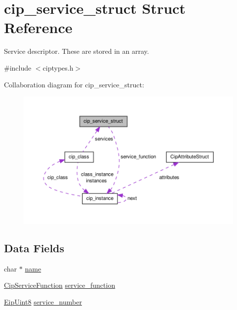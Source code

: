 \hypertarget{structcip__service__struct}{\section{cip\-\_\-service\-\_\-struct \-Struct \-Reference}
\label{d8/de2/structcip__service__struct}
}


\-Service descriptor. \-These are stored in an array.  




{\ttfamily \#include $<$ciptypes.\-h$>$}



\-Collaboration diagram for cip\-\_\-service\-\_\-struct\-:
\nopagebreak
\begin{figure}[H]
\begin{center}
\leavevmode
\includegraphics[width=350pt]{d9/dac/structcip__service__struct__coll__graph}
\end{center}
\end{figure}
\subsection*{\-Data \-Fields}
\begin{DoxyCompactItemize}
\item 
char $\ast$ \hyperlink{structcip__service__struct_ae5d6e5c2e95996dbc9bf1cd21688207e}{name}
\item 
\hyperlink{ciptypes_8h_af7606d2a9b86977aa0ac4ec9ccec3701}{\-Cip\-Service\-Function} \hyperlink{structcip__service__struct_a5f07adeac545e07afa80e2badb94b091}{service\-\_\-function}
\item 
\hyperlink{typedefs_8h_aa0c108ee762a27720919a4634643040e}{\-Eip\-Uint8} \hyperlink{structcip__service__struct_a5dee19825bde9eba9ae121d7cd0cfbcd}{service\-\_\-number}
\end{DoxyCompactItemize}


